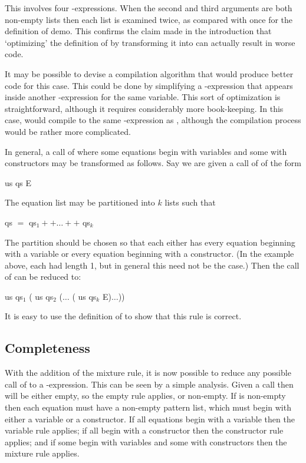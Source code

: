 This involves four -expressions. When the second and third arguments are both non-empty lists then each list is examined twice, as compared with once for the definition of demo. This confirms the claim made in the introduction that `optimizing' the definition of  by transforming it into  can actually result in worse code.

It may be possible to devise a compilation algorithm that would produce better code for this case. This could be done by simplifying a -expression that appears inside another -expression for the same variable. This sort of optimization is straightforward, although it requires considerably more book-keeping. In this case,  would compile to the same -expression as , although the compilation process would be rather more complicated.


In general, a call of  where some equations begin with variables and some with constructors may be transformed as follows. Say we are given a call of  of the form
\begin{mlcoded}
     us qs E
\end{mlcoded}
The equation list  may be partitioned into $k$ lists  such that
\begin{mlcoded}
    qs $=$ qs$_1 ++ \ldots ++$ qs$_k$
\end{mlcoded}
The partition should be chosen so that each  either has every equation beginning with a variable or every equation beginning with a constructor. (In the example above, each  had length 1, but in general this need not be the case.) Then the call of  can be reduced to:
\begin{mlcoded}
     us qs$_1$ ( us qs$_2$ ($\ldots$ ( us qs$_k$ E)$\ldots$))
\end{mlcoded}
It is easy to use the definition of  to show that this rule is correct.

\subsection{Completeness}
With the addition of the mixture rule, it is now possible to reduce any possible call of  to a -expression. This can be seen by a simple analysis. Given a call  then  will be either empty, so the empty rule applies, or non-empty. If  is non-empty then each equation must have a non-empty pattern list, which must begin with either a variable or a constructor. If all equations begin with a variable then the variable rule applies; if all begin with a constructor then the constructor rule applies; and if some begin with variables and some with constructors then the mixture rule applies.

